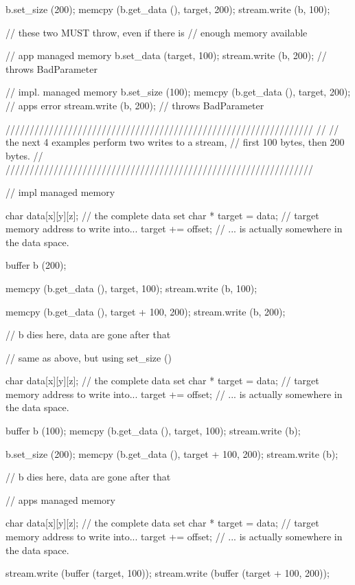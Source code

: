 \begin{mycode}
{    {
      b.set_size (200);
      memcpy (b.get_data (), target, 200);
      stream.write (b, 100);
    }
  
  
    // these two MUST throw, even if there is 
    // enough memory available
  
    // app managed memory
    {
      b.set_data (target, 100);
      stream.write (b, 200); // throws BadParameter
    }
  
    // impl. managed memory
    {
      b.set_size (100);
      memcpy (b.get_data (), target, 200); // apps error
      stream.write (b, 200); // throws BadParameter
    }
  }
  
  
  ////////////////////////////////////////////////////////////////
  //
  // the next 4 examples perform two writes to a stream, 
  // first 100 bytes, then 200 bytes.
  //
  ////////////////////////////////////////////////////////////////
  
  // impl managed memory
  {
    char   data[x][y][z]; // the complete data set
    char * target = data; // target memory address to write into...
    target += offset;     // ... is actually somewhere in the data space.
  
    {
      buffer b (200);
  
      memcpy (b.get_data (), target, 100);
      stream.write (b, 100);
      
      memcpy (b.get_data (), target + 100, 200);
      stream.write (b, 200);
  
    } // b dies here, data are gone after that
  }
  
  
  // same as above, but using set_size ()
  {
    char   data[x][y][z]; // the complete data set
    char * target = data; // target memory address to write into...
    target += offset;     // ... is actually somewhere in the data space.
  
    {
      buffer b (100);
      memcpy (b.get_data (), target, 100);
      stream.write (b);
  
      b.set_size (200);
      memcpy (b.get_data (), target + 100, 200);
      stream.write (b);
  
    } // b dies here, data are gone after that
  }
  
  
  // apps managed memory
  {
    char   data[x][y][z]; // the complete data set
    char * target = data; // target memory address to write into...
    target += offset;     // ... is actually somewhere in the data space.
  
    stream.write (buffer (target,       100));
    stream.write (buffer (target + 100, 200));
  
}
\end{mycode}
